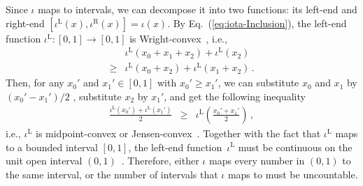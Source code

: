 \documentclass[english,reprint, aps, prl,superscriptaddress, showpacs,
showkeys, longbibliography, amsmath, amssymb, floatfix]{revtex4-1}
\theoremstyle{plain}
\theoremstyle{definition}
\newcommand{\iotal}[1][]{\ensuremath{\iota^{\mathrm{L{#1}}}}}
\newcommand{\iotar}[1][]{\ensuremath{\iota^{\mathrm{R{#1}}}}}
\begin{document}
Since $\iota$ maps to intervals, we can decompose it into two functions:
its left-end and right-end $\left[\iotal\left(x\right),\iotar\left(x\right)\right]=\iota\left(x\right)$.
By Eq.~(\ref{eq:iota-Inclusion}), the left-end function $\iotal:\left[0,1\right]\rightarrow\left[0,1\right]$
is Wright-convex~\citep{Wright1954,RobertsVarberg1973,PecaricTong1992},
i.e., 
\begin{equation}
\begin{aligned} & \iotal\left(x_{0}+x_{1}+x_{2}\right)+\iotal\left(x_{2}\right)\\
\ge{} & \iotal\left(x_{0}+x_{2}\right)+\iotal\left(x_{1}+x_{2}\right)\,.
\end{aligned}
\end{equation}
Then, for any $x_{0}'$ and $x_{1}'\in\left[0,1\right]$ with $x_{0}'\ge x_{1}'$,
we can substitute $x_{0}$ and $x_{1}$ by $\left(x_{0}'-x_{1}'\right)/2$
, substitute $x_{2}$ by $x_{1}'$, and get the following inequality
\begin{eqnarray}
\frac{\iotal\left(x_{0}'\right)+\iotal\left(x_{1}'\right)}{2} & \ge & \iotal\left(\frac{x_{0}'+x_{1}'}{2}\right)\,,
\end{eqnarray}
i.e., $\iotal$ is midpoint-convex or Jensen-convex~\citep{Klee_1956,Kenyon_1956,RobertsVarberg1973,PecaricTong1992}.
Together with the fact that $\iotal$ maps to a bounded interval $\left[0,1\right]$,
the left-end function~$\iotal$ must be continuous on the unit open
interval $\left(0,1\right)$~\citep{Jensen_1906,RobertsVarberg1973}.
Therefore, either $\iota$ maps every number in $\left(0,1\right)$
to the same interval, or the number of intervals that $\iota$ maps
to must be uncountable.
\end{document}
